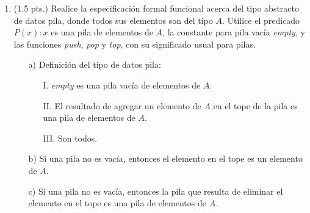 \documentclass[12pt,letterpaper]{article}
\begin{document}
\begin{enumerate}

\item (1.5 pts.) Realice la especificación formal funcional acerca del tipo abstracto de datos pila, donde todos sus elementos son del tipo $A$. Utilice el predicado $P(x) : x$ es una pila de elementos de $A$, la constante para pila vacía \textit{empty}, y las funciones \textit{push}, \textit{pop} y \textit{top}, con su significado usual para pilas.
  \begin{enumerate}
  \item[a)] Definición del tipo de datos pila:
    \begin{enumerate}
    \item[\footnotesize I.] \textit{empty} es una pila vacía de elementos de $A$.
    \item[\footnotesize II.] El resultado de agregar un elemento de $A$ en el tope de la pila es una pila de elementos de $A$.
    \item[\footnotesize III.] Son todos.
    \end{enumerate}
  \item[b)] Si una pila no es vacía, entonces el elemento en el tope es un elemento de $A$.
  \item[c)] Si una pila no es vacía, entonces la pila que resulta de eliminar el elemento en el tope es una pila de elementos de $A$.
  \end{enumerate}
  \bigskip
  \bigskip


\end{enumerate}
\end{document}
